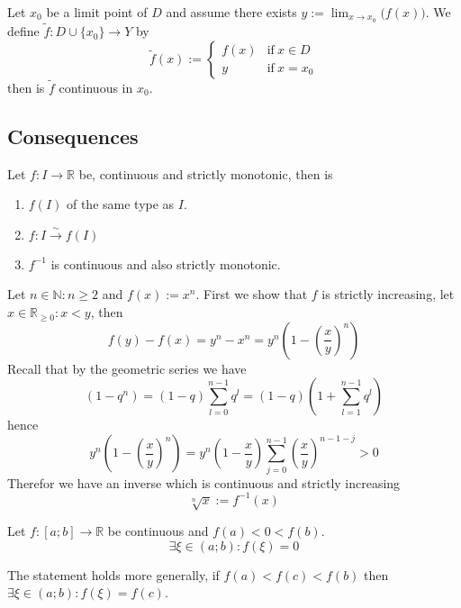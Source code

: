 \begin{proposition}
   Let \(x_0\) be a limit point of \(D\) and assume there exists \(y := \lim_{x \to x_0}\big(f(x)\big)\).
   We define \(\tilde{f}: D \cup \{x_0\} \to Y\) by
   \[\tilde{f}(x) := \begin{cases}f(x) & \text{if}~x \in D\\ y & \text{if}~x = x_0\end{cases}\]
   then is \(\tilde{f}\) continuous in \(x_0\).
\end{proposition}

\subsection{Consequences}
\begin{theorem}
   Let \(f: I \to \mathbb{R}\) be, continuous and strictly monotonic, then is
   \begin{enumerate}[label=\roman*, align=Center]
      \item \(f(I)\) of the same type as \(I\).
      \item \(f:I \xrightarrow{\sim} f(I)\)
      \item \(f^{-1}\) is continuous and also strictly monotonic.
   \end{enumerate}
\end{theorem}
\begin{example}
   Let \(n \in \mathbb{N}: n \geq 2\) and \(f(x) := x^n\).
   First we show that \(f\) is strictly increasing, let \(x \in \mathbb{R}_{\geq 0}: x < y\), then
   \[f(y) - f(x) = y^n - x^n = y^n \left(1 - \left(\frac{x}{y}\right)^n\right)\]
   Recall that by the geometric series we have
   \[(1- q^n) = (1-q) \sum_{l=0}^{n-1} q^l = (1-q)\left(1 + \sum_{l=1}^{n-1} q^l\right)\]
   hence
   \[y^n \left(1 - \left(\frac{x}{y}\right)^n\right) = y^n \left(1 - \frac{x}{y}\right) \sum_{j=0}^{n-1} \left(\frac{x}{y}\right)^{n-1-j} > 0\]
   Therefor we have an inverse which is continuous and strictly increasing
   \[\sqrt[n]{x} := f^{-1}(x)\]
\end{example}

\begin{theorem}\label{thm:intmd_value}
   Let \(f: [a; b] \to \mathbb{R}\) be continuous and \(f(a) < 0 < f(b)\).
   \[\exists \xi \in (a;b): f(\xi) = 0\]
\end{theorem}
\begin{remark}[Tips]
   The statement holds more generally, if \(f(a) < f(c) < f(b)\) then \(\exists \xi \in (a;b): f(\xi) = f(c)\).
\end{remark}


